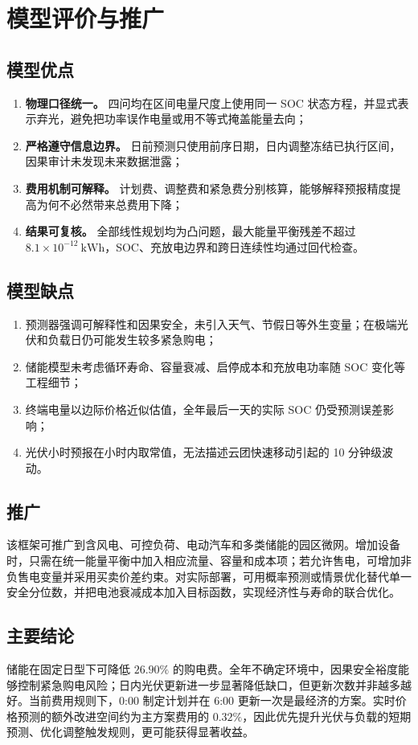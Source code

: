 \section{模型评价与推广}

\subsection{模型优点}

\begin{enumerate}
  \item \textbf{物理口径统一。} 四问均在区间电量尺度上使用同一 SOC 状态方程，并显式表示弃光，避免把功率误作电量或用不等式掩盖能量去向；
  \item \textbf{严格遵守信息边界。} 日前预测只使用前序日期，日内调整冻结已执行区间，因果审计未发现未来数据泄露；
  \item \textbf{费用机制可解释。} 计划费、调整费和紧急费分别核算，能够解释预报精度提高为何不必然带来总费用下降；
  \item \textbf{结果可复核。} 全部线性规划均为凸问题，最大能量平衡残差不超过
  $8.1\times10^{-12}~\mathrm{kWh}$，SOC、充放电边界和跨日连续性均通过回代检查。
\end{enumerate}

\subsection{模型缺点}

\begin{enumerate}
  \item 预测器强调可解释性和因果安全，未引入天气、节假日等外生变量；在极端光伏和负载日仍可能发生较多紧急购电；
  \item 储能模型未考虑循环寿命、容量衰减、启停成本和充放电功率随 SOC 变化等工程细节；
  \item 终端电量以边际价格近似估值，全年最后一天的实际 SOC 仍受预测误差影响；
  \item 光伏小时预报在小时内取常值，无法描述云团快速移动引起的 10 分钟级波动。
\end{enumerate}

\subsection{推广}

该框架可推广到含风电、可控负荷、电动汽车和多类储能的园区微网。增加设备时，只需在统一能量平衡中加入相应流量、容量和成本项；若允许售电，可增加非负售电变量并采用买卖价差约束。对实际部署，可用概率预测或情景优化替代单一安全分位数，并把电池衰减成本加入目标函数，实现经济性与寿命的联合优化\cite{morales2014}。

\subsection{主要结论}

储能在固定日型下可降低 $26.90\%$ 的购电费。全年不确定环境中，因果安全裕度能够控制紧急购电风险；日内光伏更新进一步显著降低缺口，但更新次数并非越多越好。当前费用规则下，0:00 制定计划并在 6:00 更新一次是最经济的方案。实时价格预测的额外改进空间约为主方案费用的 $0.32\%$，因此优先提升光伏与负载的短期预测、优化调整触发规则，更可能获得显著收益。
